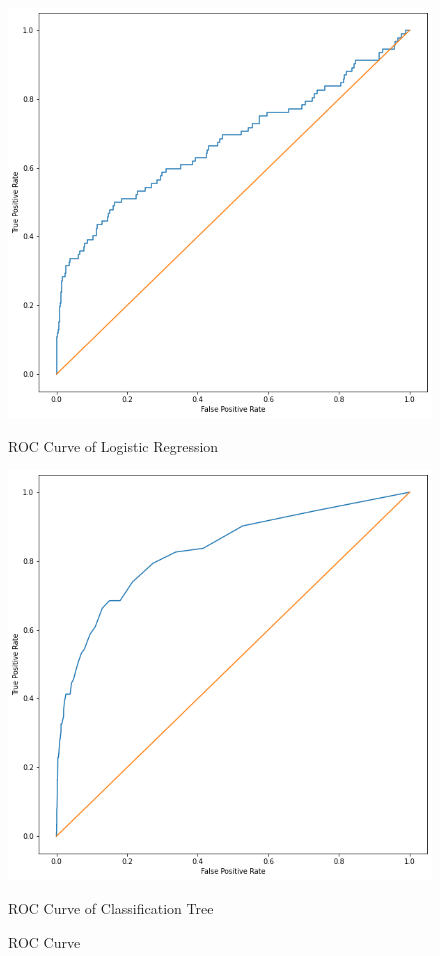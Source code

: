 \documentclass[11pt]{report}
\begin{document}
\begin{figure}[h]
     \centering
     \begin{minipage}{0.49\textwidth}
     \centering
     \includegraphics[width = \linewidth]{lr_roc.png}
     \caption{ROC Curve of Logistic Regression}\label{fig:lr_roc}
     \end{minipage}
     \centering
     \begin{minipage}{0.49\textwidth}
     \centering
     \includegraphics[width = \linewidth]{rf_roc.png}
     \caption{ROC Curve of Classification Tree}\label{fig:rf_roc}
     \end{minipage}
     \caption{ROC Curve}\label{fig:roc}
 \end{figure}
\end{document}
